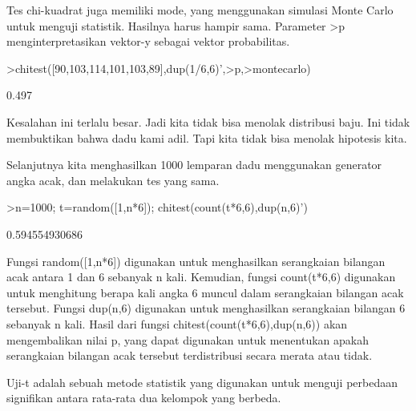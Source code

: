 \documentclass[a4paper,10pt]{article}
\begin{document}
\begin{eulernotebook}
\begin{eulercomment}
\begin{eulercomment}
\begin{eulercomment}
\begin{eulercomment}
\begin{eulercomment}
\begin{eulercomment}
\begin{eulercomment}
\begin{eulercomment}
\begin{eulercomment}
\begin{eulercomment}
\begin{eulercomment}
\begin{eulercomment}
\begin{eulercomment}
\begin{eulercomment}
\begin{eulercomment}
\begin{eulercomment}
\begin{eulercomment}
\begin{eulercomment}
\begin{eulercomment}
\begin{eulercomment}
\begin{eulercomment}
Tes chi-kuadrat juga memiliki mode, yang menggunakan simulasi Monte
Carlo untuk menguji statistik. Hasilnya harus hampir sama. Parameter
\textgreater{}p menginterpretasikan vektor-y sebagai vektor probabilitas.
\end{eulercomment}
\begin{eulerprompt}
>chitest([90,103,114,101,103,89],dup(1/6,6)',>p,>montecarlo)
\end{eulerprompt}
\begin{euleroutput}
  0.497
\end{euleroutput}
\begin{eulercomment}
Kesalahan ini terlalu besar. Jadi kita tidak bisa menolak distribusi
baju. Ini tidak membuktikan bahwa dadu kami adil. Tapi kita tidak bisa
menolak hipotesis kita.

Selanjutnya kita menghasilkan 1000 lemparan dadu menggunakan generator
angka acak, dan melakukan tes yang sama.
\end{eulercomment}
\begin{eulerprompt}
>n=1000; t=random([1,n*6]); chitest(count(t*6,6),dup(n,6)')
\end{eulerprompt}
\begin{euleroutput}
  0.594554930686
\end{euleroutput}
\begin{eulercomment}
Fungsi random([1,n*6]) digunakan untuk menghasilkan serangkaian
bilangan acak antara 1 dan 6 sebanyak n kali. Kemudian, fungsi
count(t*6,6) digunakan untuk menghitung berapa kali angka 6 muncul
dalam serangkaian bilangan acak tersebut. Fungsi dup(n,6) digunakan
untuk menghasilkan serangkaian bilangan 6 sebanyak n kali. Hasil dari
fungsi chitest(count(t*6,6),dup(n,6)) akan mengembalikan nilai p, yang
dapat digunakan untuk menentukan apakah serangkaian bilangan acak
tersebut terdistribusi secara merata atau tidak.

\end{eulercomment}
\begin{eulercomment}
Uji-t adalah sebuah metode statistik yang digunakan untuk menguji
perbedaan signifikan antara rata-rata dua kelompok yang berbeda.


\end{eulercomment}
\end{eulercomment}
\end{eulercomment}
\end{eulercomment}
\end{eulercomment}
\end{eulercomment}
\end{eulercomment}
\end{eulercomment}
\end{eulercomment}
\end{eulercomment}
\end{eulercomment}
\end{eulercomment}
\end{eulercomment}
\end{eulercomment}
\end{eulercomment}
\end{eulercomment}
\end{eulercomment}
\end{eulercomment}
\end{eulercomment}
\end{eulercomment}
\end{eulercomment}
\end{eulernotebook}
\end{document}
